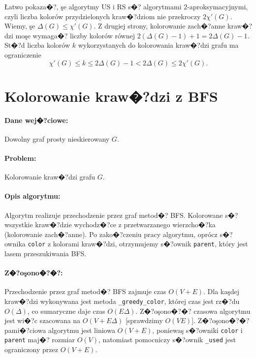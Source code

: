 \documentclass[12pt,a4paper]{mwrep}
\begin{document}
Łatwo pokaza�?, şe algorytmy US i RS s�? algorytmami 2-aproksymacyjnymi,
czyli liczba kolorów przydzielonych kraw�?dziom nie przekroczy $2 \chi'(G)$.
Wiemy, şe $\Delta(G) \le \chi'(G)$. Z drugiej strony, kolorowanie 
zach�?anne kraw�?dzi moşe wymaga�? liczby kolorów równej
$2 (\Delta(G) -1) + 1 = 2 \Delta(G) -1$. St�?d liczba kolorów $k$ 
wykorzystanych do kolorowania kraw�?dzi grafu ma ograniczenie
\begin{equation}
\chi'(G) \le k \le 2 \Delta(G) -1 < 2 \Delta(G) \le 2 \chi'(G).
\end{equation}




\section{Kolorowanie kraw�?dzi z BFS}
\label{sec:kolorowanie_krawedzi_bfs}

\paragraph{Dane wej�?ciowe:} Dowolny graf prosty nieskierowany $G$.

\paragraph{Problem:} Kolorowanie kraw�?dzi grafu $G$.

\paragraph{Opis algorytmu:} Algorytm realizuje przechodzenie przez
graf metod�? BFS. Kolorowane s�? wszystkie kraw�?dzie wychodz�?ce
z przetwarzanego wierzcho�?ka (kolorowanie zach�?anne).
Po zako�?czeniu pracy algorytmu, oprócz s�?ownika \lstinline|color|
z kolorami kraw�?dzi, otrzymujemy s�?ownik \lstinline|parent|,
który jest lasem przeszukiwania BFS.

\paragraph{Z�?oşono�?�?:} Przechodzenie przez graf metod�? BFS
zajmuje czas $O(V+E)$. Dla kaşdej kraw�?dzi wykonywana jest metoda
\lstinline|_greedy_color|, której czas jest rz�?du $O(\Delta)$,
co sumaryczne daje czas $O(E \Delta)$.
Z�?oşono�?�? czasowa algorytmu jest wi�?c szacowana na $O(V+E\Delta)$
[sprawdzimy $O(V E)$].
Z�?oşono�?�? pami�?ciowa algorytmu jest liniowa $O(V+E)$,
poniewaş s�?owniki \lstinline|color| i \lstinline|parent|
maj�? rozmiar $O(V)$, natomiast pomocniczy s�?ownik \lstinline|_used|
jest ograniczony przez $O(V+E)$.
\end{document}
